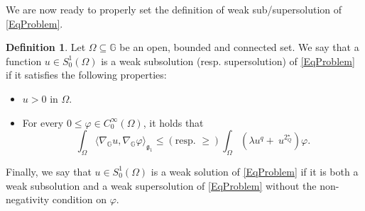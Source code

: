 \documentclass[11pt]{amsart}
\numberwithin{equation}{section} %
\theoremstyle{definition}
\newtheorem{defin}[teo]{Definition}
\begin{document}
We are now ready to properly set the definition of weak sub/supersolution of \eqref{EqProblem}.
\begin{defin}\label{def:weak_sub_super_sol}
	Let $\Omega\subseteq\mathbb{G}$ be an open, bounded and connected set.
We say that a function $u \in S^{1}_{0}(\Omega)$ is a weak subsolution (resp. supersolution) of \eqref{EqProblem} if it satisfies the following properties:
	\begin{itemize}
		\item[(i)] $u>0$ in $\Omega$.
		\item[(ii)] For every $0\leq \varphi \in C^{\infty}_{0}(\Omega)$, it holds that
		\begin{equation}\label{eq:weak_sub_super_sol}
			\int_{\Omega}\langle \nabla_{\mathbb{G}}u, \nabla_{\mathbb{G}}\varphi \rangle_{\mathfrak{g}_{1}} \leq (\textrm{resp. } \geq)  \int_{\Omega}\left(\lambda u^{q}  + \ u^{2^{\star}_{Q}}\right)\varphi.
		\end{equation}
	\end{itemize}
	Finally, we say that $u \in S^{1}_{0}(\Omega)$ is a weak solution of \eqref{EqProblem} if it is both a weak subsolution and a weak supersolution of \eqref{EqProblem} without the non-negativity condition on $\varphi$.
\end{defin}
\end{document}
